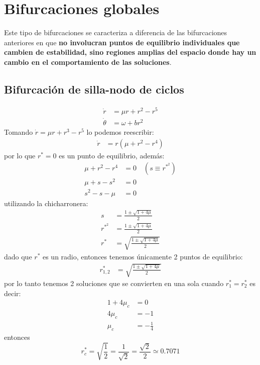 \section{Bifurcaciones globales}
Este tipo de bifurcaciones se caracteriza a diferencia de las bifurcaciones anteriores en que \textbf{no involucran puntos de equilibrio individuales que cambien de estabilidad, sino regiones amplias del espacio donde hay un cambio en el comportamiento de las soluciones}. 
\subsection{Bifurcación de silla-nodo de ciclos}
\begin{ejemplo}
  \begin{align*}
    \dot{r} &= \mu r + r^2- r^{5} \\
    \dot{\theta} &= \omega + br^2 
  \end{align*}
  Tomando $\dot{r}=\mu r + r^3-r^{5}$ lo podemos reescribir:
  \begin{align*}
    \dot{r} &= r (\mu + r^2 - r^{4})
  \end{align*}
  por lo que $r^*=0$ es un punto de equilibrio, además:
  \begin{align*}
    \mu+r^2-r^{4} &= 0  \quad  \left( s \equiv r^{{*}^2} \right)  \\
    \mu + s - s^2&= 0 \\              
    s^2-s-\mu &= 0
  \end{align*}
  utilizando la chicharronera:
  \begin{align*}
      s &= \frac{1\pm \sqrt{1+4\mu}}{2} \\
    	r^{{*}^2} &= \frac{1\pm \sqrt{1+4\mu}}{2} \\
    	r^* &= \sqrt{\frac{1\pm \sqrt{1+4\mu}}{2}}
  \end{align*}
  dado que $r^*$ es un radio, entonces tenemos únicamente 2 puntos de equilibrio:
  \begin{align*}
    	r^*_{1,2} &= \sqrt{\frac{1\pm \sqrt{1+4\mu}}{2}}
  \end{align*}
  por lo tanto tenemos 2 soluciones que se convierten en una sola cuando $r_1^*=r_2^*$ es decir:
  \begin{align*}
    1+4\mu_c &= 0 \\
    4\mu_c&= -1 \\
    \mu_c&= -\frac{1}{4}
  \end{align*}
  entonces
  \begin{equation*}
    r_c^*=\sqrt{\frac{1}{2}} = \frac{1}{\sqrt{2}} = \frac{\sqrt{2}}{2} \simeq 0.7071 
  \end{equation*}


\end{ejemplo}
